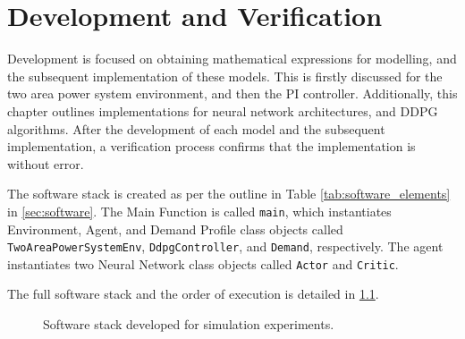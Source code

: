 \chapter{Development and Verification}
Development is focused on obtaining mathematical expressions for modelling, and the subsequent implementation of these models. This is firstly discussed for the two area power system environment, and then the PI controller. Additionally, this chapter outlines implementations for neural network architectures, and DDPG algorithms. After the development of each model and the subsequent implementation, a verification process confirms that the implementation is without error.

The software stack is created as per the outline in Table \ref{tab:software_elements} in \textsection \ref{sec:software}. The Main Function is called \texttt{main}, which instantiates Environment, Agent, and Demand Profile class objects called \texttt{TwoAreaPowerSystemEnv}, \texttt{DdpgController}, and \texttt{Demand}, respectively. The agent instantiates two Neural Network class objects called \texttt{Actor} and \texttt{Critic}.

The full software stack and the order of execution is detailed in \ref{5001_software_stack}.

\begin{figure}[h]
	\centering
	\resizebox{10cm}{!}{}
	\caption{Software stack developed for simulation experiments.}\label{5001_software_stack}
\end{figure}











